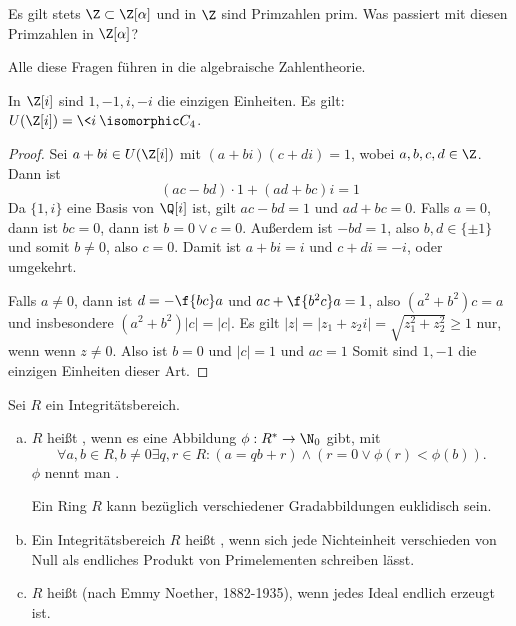 Es gilt stets $\Z \subset \Z[\alpha]$ und in $\Z$ sind Primzahlen prim.
Was passiert mit diesen Primzahlen in $\Z[\alpha]$?

Alle diese Fragen führen in die algebraische Zahlentheorie.

\begin{lem} \label{4.4}
	In $\Z[i]$ sind $1, -1, i, -i$ die einzigen Einheiten.
	Es gilt: $U(\Z[i]) = \< i \> \isomorphic C_4$.
	\begin{proof}
		Sei $a + bi \in U(\Z[i])$ mit
		$(a + bi)(c + di) = 1$, wobei $a, b, c, d \in \Z$.
		Dann ist
		\[
			(ac - bd)\cdot 1 + (ad + bc) i = 1
		\]
		Da $\{1, i\}$ eine Basis von $\Q[i]$ ist, gilt $ac - bd = 1$ und $ad +  bc = 0$.
		Falls $a = 0$, dann ist $bc = 0$, dann ist $b = 0 \lor c = 0$.
		Außerdem ist $-bd = 1$, also $b,d \in \{\pm 1\}$ und somit $b \neq 0$, also $c = 0$.
		Damit ist $a + bi = i$ und $c + di = -i$, oder umgekehrt.

		Falls $a \neq 0$, dann ist $d = - \f{bc}a$ und $ac + \f{b^2 c}a = 1$, also $(a^2 + b^2)c = a$ und insbesondere $(a^2 + b^2)|c| = |c|$.
		Es gilt $|z| = |z_1 + z_2 i| = \sqrt{z_1^2 + z_2^2} \ge 1$ nur, wenn wenn $z \neq 0$.
		Also ist $b = 0$ und $|c| = 1$ und $ac = 1$
		Somit sind $1, -1$ die einzigen Einheiten dieser Art.
	\end{proof}
\end{lem}

\begin{df} \label{4.5}
	Sei $R$ ein Integritätsbereich.
	\begin{enumerate}[a)]
		\item
			$R$ heißt , wenn es eine Abbildung $\phi: R^* \to \N_0$ gibt, mit
			\[
				\forall a, b \in R, b \neq 0 \exists q,r \in R : (a = qb + r) \land (r = 0 \lor \phi(r) < \phi(b)).
			\]
			$\phi$ nennt man .
			\begin{note}
				Ein Ring $R$ kann bezüglich verschiedener Gradabbildungen euklidisch sein.
			\end{note}
		\item
			Ein Integritätsbereich $R$ heißt , wenn sich jede Nichteinheit verschieden von Null als endliches Produkt von Primelementen schreiben lässt.
		\item
			$R$ heißt  (nach Emmy Noether, 1882-1935), wenn jedes Ideal endlich erzeugt ist.
	\end{enumerate}
\end{df}

